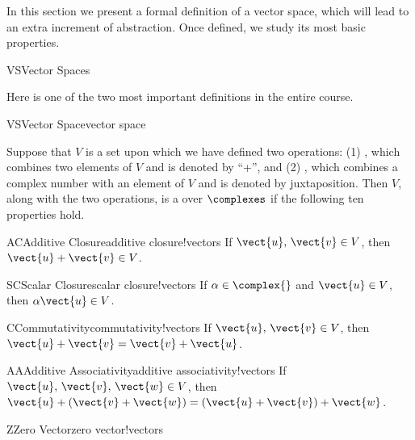 %
\begin{introduction}
\begin{para}In this section we present a formal definition of a vector space, which will lead to an extra increment of abstraction.  Once defined, we study its most basic properties.\end{para}
\end{introduction}
%
\begin{subsect}{VS}{Vector Spaces}
%
\begin{para}Here is one of the two most important definitions in the entire course.\end{para}
%
\begin{definition}{VS}{Vector Space}{vector space}
%
\begin{para}Suppose that $V$ is a set upon which we have defined two operations: (1) , which combines two elements of $V$ and is denoted by ``+'', and (2) , which combines a complex number with an element of $V$ and is denoted by juxtaposition.   Then $V$, along with the two operations, is a  over $\complexes$ if the following ten properties hold.
%
\begin{propertylist}
%
\begin{property}{AC}{Additive Closure}{additive closure!vectors}
If $\vect{u},\,\vect{v}\in V$, then $\vect{u}+\vect{v}\in V$.\end{property}
%
\begin{property}{SC}{Scalar Closure}{scalar closure!vectors}
If $\alpha\in\complex{\null}$ and $\vect{u}\in V$, then $\alpha\vect{u}\in V$.\end{property}
%
\begin{property}{C}{Commutativity}{commutativity!vectors}
If $\vect{u},\,\vect{v}\in V$, then $\vect{u}+\vect{v}=\vect{v}+\vect{u}$.\end{property}
%
\begin{property}{AA}{Additive Associativity}{additive associativity!vectors}
If $\vect{u},\,\vect{v},\,\vect{w}\in V$, then $\vect{u}+\left(\vect{v}+\vect{w}\right)=\left(\vect{u}+\vect{v}\right)+\vect{w}$.\end{property}
%
\begin{property}{Z}{Zero Vector}{zero vector!vectors}

\end{property}
\end{propertylist}
\end{para}
\end{definition}
\end{subsect}
